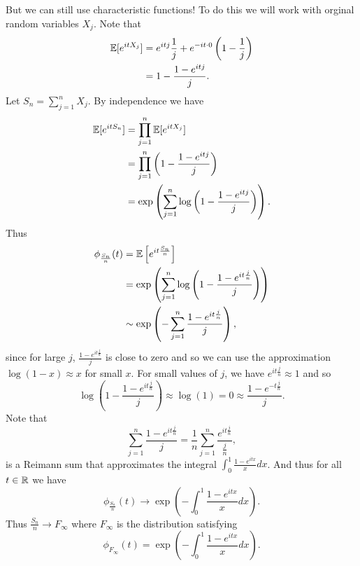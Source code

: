 \begin{ex}
    \grumpy

    But we can still use characteristic functions! To do this we will work with orginal random variables $X_j$. Note that
    \begin{align*}
        {\mathbb{E}}[e^{i t X_j}] &= e^{itj}\frac{1}{j}+e^{-it\cdot 0}\left(1-\frac{1}{j}\right)\\
        &= 1-\frac{1-e^{itj}}{j}.
    \end{align*}
    Let $S_n = \sum_{j=1}^n X_j$. By independence we have 
    \begin{align*}
        {\mathbb{E}}[e^{itS_n}]&=\prod_{j=1}^n {\mathbb{E}}[e^{i t X_j}]\\
        &= \prod_{j=1}^n \left(1- \frac{1-e^{itj}}{j}\right)\\
        &= \exp\left({\sum_{j=1}^n \log\left(1-\frac{1-e^{itj}}{j}\right)}\right).
    \end{align*}
    Thus
    \begin{align*}
        \phi_{\frac{S_n}{n}}(t) &= {\mathbb{E}}\left[e^{it\frac{S_n}{n}}\right]\\
        &=\exp\left({\sum_{j=1}^n \log\left(1-\frac{1-e^{it\frac{j}{n}}}{j}\right)}\right) \\
        &\sim \exp\left(-\sum_{j=1}^n \frac{1-e^{it\frac{j}{n}}}{j} \right),
    \end{align*}
    since for large $j$, $\frac{1-e^{it\frac{j}{n}}}{j}$ is close to zero and so we can use the approximation $\log(1-x)\approx x$ for small $x$. For small values of $j$, we have $e^{it\frac{j}{n}} \approx 1$ and so 
    \[\log\left(1-\frac{1-e^{it\frac{j}{n}}}{j}\right) \approx \log(1) = 0 \approx \frac{1-e^{-t\frac{j}{n}}}{j}.  \]
    Note that 
    \[\sum_{j=1}^n \frac{1-e^{it\frac{j}{n}}}{j} = \frac{1}{n}\sum_{j=1}^n \frac{e^{it\frac{j}{n}}}{\frac{j}{n}}, \]
    is a Reimann sum that approximates the integral $\int_0^1 \frac{1-e^{itx}}{x}dx$. And thus for all $t\in {\mathbb R}$ we have 
    \[\phi_{\frac{S_n}{n}}(t) \to \exp\left(-\int_0^1 \frac{1-e^{itx}}{x}dx\right). \]
    Thus $\frac{S_n}{n} \to F_\infty$ where $F_\infty$ is the distribution satisfying 
    \[\phi_{F_\infty}(t) =  \exp\left(-\int_0^1 \frac{1-e^{itx}}{x}dx\right). \]
\end{ex}
